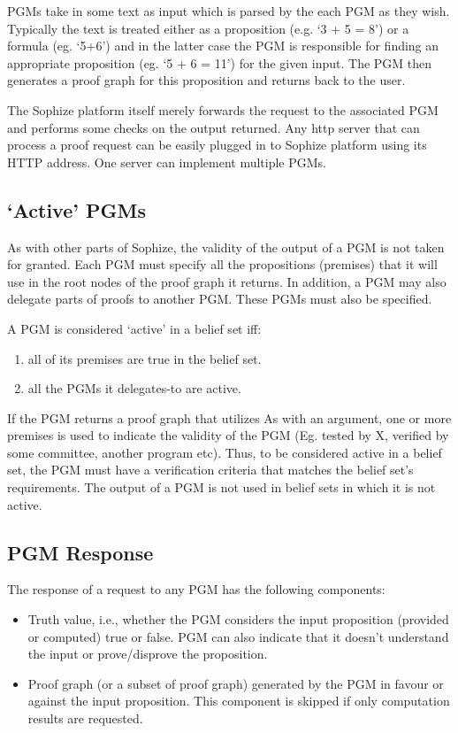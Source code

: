 \documentclass[a4paper]{article}
\begin{document}
PGMs take in some text as input which is parsed by the each PGM as they wish. Typically the text is treated either as a proposition (e.g. `3 + 5 = 8') or a formula (eg. `5+6') and in the latter case the PGM is responsible for finding an appropriate proposition (eg. `5 + 6 = 11') for the given input. The PGM then generates a proof graph for this proposition and returns back to the user.

The Sophize platform itself merely forwards the request to the associated PGM and performs some checks on the output returned. Any http server that can process a proof request can be easily plugged in to Sophize platform using its HTTP address. One server can implement multiple PGMs.

\subsection{`Active' PGMs}
As with other parts of Sophize, the validity of the output of a PGM is not taken for granted. Each PGM must specify all the propositions (premises) that it will use in the root nodes of the proof graph it returns. In addition, a PGM may also delegate parts of proofs to another PGM. These PGMs must also be specified. 

A PGM is considered `active' in a belief set iff:
\begin{enumerate}
\item all of its premises are true in the belief set.
\item all the PGMs it delegates-to are active.
\end{enumerate}

If the PGM returns a proof graph that utilizes As with an argument, one or more premises is used to indicate the validity of the PGM (Eg. tested by X, verified by some committee, another program etc). Thus, to be considered active in a belief set, the PGM must have a verification criteria that matches the belief set's requirements. The output of a PGM is not used in belief sets in which it is not active.

\subsection{PGM Response}
The response of a request to any PGM has the following components:

\begin{itemize}

\item Truth value, i.e., whether the PGM considers the input proposition (provided or computed) true or false. PGM can also indicate that it doesn't understand the input or prove/disprove the proposition.

\item Proof graph (or a subset of proof graph) generated by the PGM in favour or against the input proposition. This component is skipped if only computation results are requested.
\end{itemize}
\end{document}
